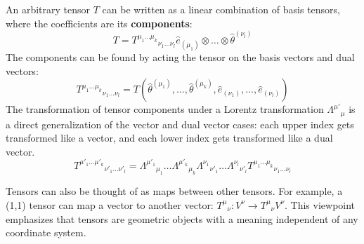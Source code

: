 \documentclass[11pt, a4paper]{report}
\begin{document}
An arbitrary tensor $T$ can be written as a linear combination of basis tensors, where the coefficients are its \textbf{components}:
\begin{equation}
    T = {T^{\mu_1 \dots \mu_k}}_{\nu_1 \dots \nu_l} \hat{e}_{(\mu_1)} \otimes \dots \otimes \hat{\theta}^{(\nu_l)}
\end{equation}
The components can be found by acting the tensor on the basis vectors and dual vectors:
\begin{equation}
    {T^{\mu_1 \dots \mu_k}}_{\nu_1 \dots \nu_l} = T(\hat{\theta}^{(\mu_1)}, \dots, \hat{\theta}^{(\mu_k)}, \hat{e}_{(\nu_1)}, \dots, \hat{e}_{(\nu_l)})
\end{equation}
The transformation of tensor components under a Lorentz transformation ${\Lambda^{\mu'}}_{\mu}$ is a direct generalization of the vector and dual vector cases: each upper index gets transformed like a vector, and each lower index gets transformed like a dual vector.
\begin{equation}
    {T^{\mu'_1 \dots \mu'_k}}_{\nu'_1 \dots \nu'_l} = {\Lambda^{\mu'_1}}_{\mu_1} \dots {\Lambda^{\mu'_k}}_{\mu_k} {\Lambda^{\nu_1}}_{\nu'_1} \dots {\Lambda^{\nu_l}}_{\nu'_l} {T^{\mu_1 \dots \mu_k}}_{\nu_1 \dots \nu_l}
\end{equation}

Tensors can also be thought of as maps between other tensors. For example, a (1,1) tensor can map a vector to another vector: ${T^\mu}_\nu: V^\nu \to {T^\mu}_\nu V^\nu$. This viewpoint emphasizes that tensors are geometric objects with a meaning independent of any coordinate system.
\end{document}
